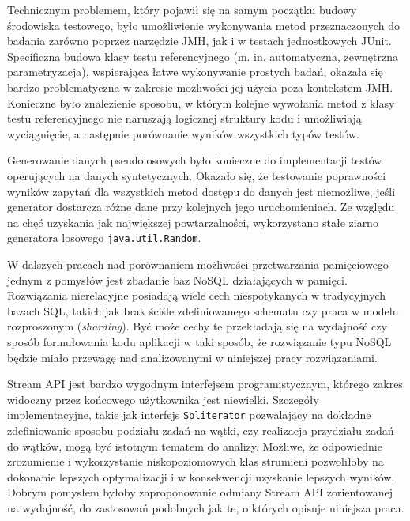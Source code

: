 \documentclass[12pt,twoside,openright]{extarticle}
\begin{document}
    Technicznym problemem, który pojawił się na samym początku budowy środowiska testowego, było umożliwienie wykonywania metod przeznaczonych do badania zarówno poprzez narzędzie JMH, jak i w testach jednostkowych JUnit. Specificzna budowa klasy testu referencyjnego (m. in. automatyczna, zewnętrzna parametryzacja), wspierająca łatwe wykonywanie prostych badań, okazała się bardzo problematyczna w zakresie możliwości jej użycia poza kontekstem JMH. Konieczne było znalezienie sposobu, w którym kolejne wywołania metod z klasy testu referencyjnego nie naruszają logicznej struktury kodu i umożliwiają wyciągnięcie, a następnie porównanie wyników wszystkich typów testów.

    Generowanie danych pseudolosowych było konieczne do implementacji testów operujących na danych syntetycznych. Okazało się, że testowanie poprawności wyników zapytań dla wszystkich metod dostępu do danych jest niemożliwe, jeśli generator dostarcza różne dane przy kolejnych jego uruchomieniach. Ze względu na chęć uzyskania jak największej powtarzalności, wykorzystano stałe ziarno generatora losowego \texttt{java.util.Random}.


    W dalszych pracach nad porównaniem możliwości przetwarzania pamięciowego jednym z pomysłów jest zbadanie baz NoSQL działających w pamięci. Rozwiązania nierelacyjne posiadają wiele cech niespotykanych w tradycyjnych bazach SQL, takich jak brak ściśle zdefiniowanego schematu czy praca w modelu rozproszonym (\textit{sharding}). Być może cechy te przekładają się na wydajność czy sposób formułowania kodu aplikacji w taki sposób, że rozwiązanie typu NoSQL będzie miało przewagę nad analizowanymi w niniejszej pracy rozwiązaniami.

    Stream API jest bardzo wygodnym interfejsem programistycznym, którego zakres widoczny przez końcowego użytkownika jest niewielki. Szczegóły implementacyjne, takie jak interfejs \texttt{Spliterator} pozwalający na dokładne zdefiniowanie sposobu podziału zadań na wątki, czy realizacja przydziału zadań do wątków, mogą być istotnym tematem do analizy. Możliwe, że odpowiednie zrozumienie i wykorzystanie niskopoziomowych klas strumieni pozwoliłoby na dokonanie lepszych optymalizacji i w konsekwencji uzyskanie lepszych wyników. Dobrym pomysłem byłoby zaproponowanie odmiany Stream API zorientowanej na wydajność, do zastosowań podobnych jak te, o których opisuje niniejsza praca.
\end{document}
